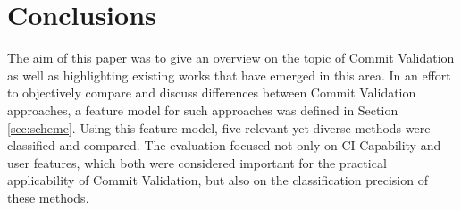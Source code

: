\section{Conclusions}
\label{sec:conclusions}




The aim of this paper was to give an overview on the topic of Commit Validation as well as highlighting existing works that have emerged in this area. In an effort to objectively compare and discuss differences between Commit Validation approaches, a feature model for such approaches was defined in Section \ref{sec:scheme}. Using this feature model, five relevant yet diverse methods were classified and compared. The evaluation focused not only on CI Capability and user features, which both were considered important for the practical applicability of Commit Validation, but also on the classification precision of these methods.

